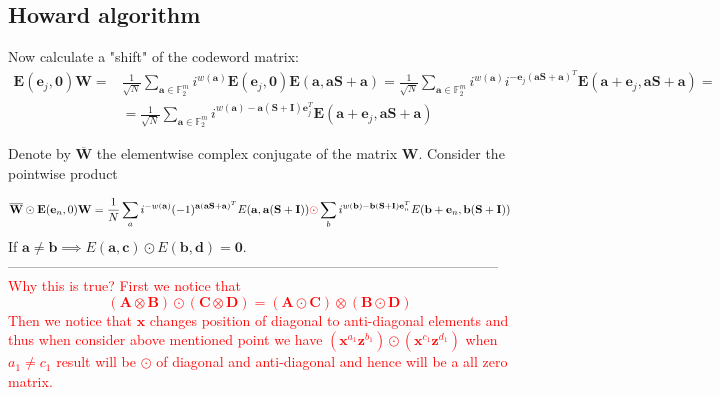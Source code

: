 \documentclass{article}
\begin{document}
	\subsection*{Howard algorithm}
	Now calculate a "shift" of the codeword matrix:
	\begin{align*}
		\mathbf{E}(\mathbf{e}_j, \mathbf{0})\mathbf{W} = &\frac{1}{\sqrt{N}} \sum_{\mathbf{a} \in \mathbb{F}^m_2} i^{w(\mathbf{a})}\mathbf{E}(\mathbf{e}_j,\mathbf{0})\mathbf{E}(\mathbf{a},\mathbf{a}\mathbf{S} + \mathbf{a}) = \frac{1}{\sqrt{N}} \sum_{\mathbf{a} \in \mathbb{F}^m_2} i^{w(\mathbf{a})}i^{-\mathbf{e}_j(\mathbf{a}\mathbf{S} + \mathbf{a})^T}\mathbf{E}(\mathbf{a} + \mathbf{e}_j,\mathbf{a}\mathbf{S} + \mathbf{a})  = \\  &= \frac{1}{\sqrt{N}} \sum_{\mathbf{a} \in \mathbb{F}^m_2} i^{w(\mathbf{a})-\mathbf{a}(\mathbf{S} + \mathbf{I})\mathbf{e}_j^T}\mathbf{E}(\mathbf{a} + \mathbf{e}_j,\mathbf{a}\mathbf{S} + \mathbf{a})
	\end{align*}
	
	
	Denote by $\overline{\mathbf{W}}$ the elementwise complex conjugate of the matrix $\mathbf{W}$. Consider the pointwise product
	
	\begin{align*}
		\overline{\mathbf{W}} \odot \mathbf{E}(\mathbf{e}_n, 0)\mathbf{W} = \frac{1}{N} \sum_a i^{-w(\mathbf{a})}(-1)^{\mathbf{a}(\mathbf{a}\mathbf{S} + \mathbf{a})^T} E(\mathbf{a}, \mathbf{a}(\mathbf{S} + \mathbf{I})) \textcolor{red}{\odot} \sum_b i^{w(\mathbf{b}) - \mathbf{b}(\mathbf{S} + \mathbf{I})\mathbf{e}_n^T} E(\mathbf{b} + \mathbf{e}_n, \mathbf{b}(\mathbf{S} + \mathbf{I}))
	\end{align*}
	If $\mathbf{a} \neq \mathbf{b} \implies E(\mathbf{a}, \mathbf{c}) \odot E(\mathbf{b}, \mathbf{d}) = \mathbf{0}$. \\
	
	
	--------------------------------------------------------------------------------------------------------- \\
	\textcolor{red}{Why this is true? First we notice that 
		\begin{equation*}
			\left(\mathbf{A} \otimes \mathbf{B} \right) \odot \left(\mathbf{C} \otimes  \mathbf{D} \right) = \left(\mathbf{A} \odot \mathbf{C} \right) \otimes \left(\mathbf{B} \odot \mathbf{D}\right)
		\end{equation*}	
		Then we notice that $\mathbf{x}$ changes position of diagonal to anti-diagonal elements and thus when consider above mentioned point we have $\left(\mathbf{x}^{a_1} \mathbf{z}^{b_1}  \right) \odot \left(\mathbf{x}^{c_1} \mathbf{z}^{d_1}  \right)$ when $a_1 \neq c_1$ result will be $\odot$ of diagonal and anti-diagonal and hence will be a all zero matrix.
	}
	
\end{document}
